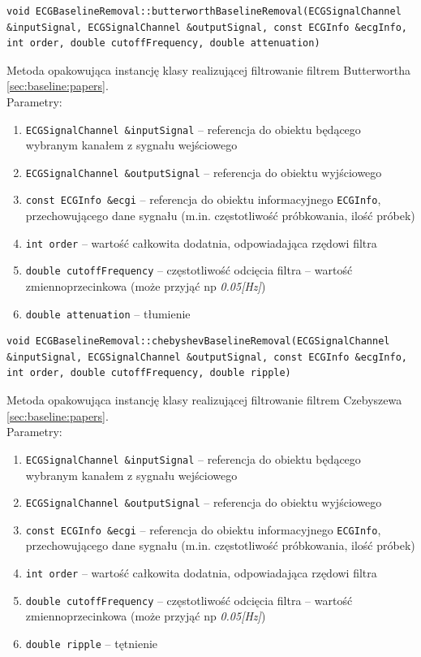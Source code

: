 \documentclass[a4paper, 11pt]{article}
\begin{document}
\begin{lstlisting}
void ECGBaselineRemoval::butterworthBaselineRemoval(ECGSignalChannel 
&inputSignal, ECGSignalChannel &outputSignal, const ECGInfo &ecgInfo, 
int order, double cutoffFrequency, double attenuation)
\end{lstlisting}
Metoda opakowująca instancję klasy realizującej filtrowanie filtrem Butterwortha \ref{sec:baseline:papers}. \\

Parametry:
\begin{enumerate}
\item \verb|ECGSignalChannel &inputSignal| -- referencja do obiektu będącego wybranym kanałem z sygnału wejściowego
\item \verb|ECGSignalChannel &outputSignal| -- referencja do obiektu wyjściowego
\item \verb|const ECGInfo &ecgi| -- referencja do obiektu informacyjnego \verb|ECGInfo|, przechowującego dane sygnału (m.in. częstotliwość próbkowania, ilość próbek)
\item \verb|int order| -- wartość całkowita dodatnia, odpowiadająca rzędowi filtra
\item \verb|double cutoffFrequency| -- częstotliwość odcięcia filtra -- wartość zmiennoprzecinkowa (może przyjąć np \textit{0.05[Hz]})
\item \verb|double attenuation| -- tłumienie 
\end{enumerate}

\begin{lstlisting}
void ECGBaselineRemoval::chebyshevBaselineRemoval(ECGSignalChannel 
&inputSignal, ECGSignalChannel &outputSignal, const ECGInfo &ecgInfo, 
int order, double cutoffFrequency, double ripple)
\end{lstlisting}
Metoda opakowująca instancję klasy realizującej filtrowanie filtrem Czebyszewa \ref{sec:baseline:papers}. \\

Parametry:
\begin{enumerate}
\item \verb|ECGSignalChannel &inputSignal| -- referencja do obiektu będącego wybranym kanałem z sygnału wejściowego
\item \verb|ECGSignalChannel &outputSignal| -- referencja do obiektu wyjściowego
\item \verb|const ECGInfo &ecgi|  -- referencja do obiektu informacyjnego \verb|ECGInfo|, przechowującego dane sygnału (m.in. częstotliwość próbkowania, ilość próbek)
\item \verb|int order|  -- wartość całkowita dodatnia, odpowiadająca rzędowi filtra
\item \verb|double cutoffFrequency|  -- częstotliwość odcięcia filtra  -- wartość zmiennoprzecinkowa (może przyjąć np \textit{0.05[Hz]})
\item \verb|double ripple|  -- tętnienie 
\end{enumerate}
\end{document}
